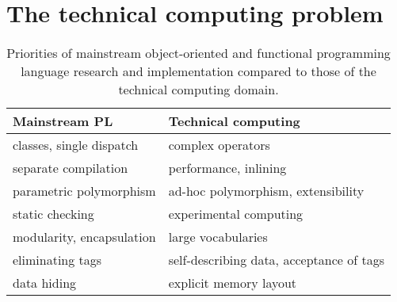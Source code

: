 

\section{The technical computing problem}

\begin{singlespace}
\begin{table}
  \begin{center}
    \def\arraystretch{1.25}
    \begin{tabular}{|l|l|}\hline
      \textbf{Mainstream PL} & \textbf{Technical computing} \\
      \hline \hline
      classes, single dispatch             &  complex operators \\
      \hline
      separate compilation                 &  performance, inlining \\
      \hline
      parametric polymorphism              &  ad-hoc polymorphism, extensibility \\
      \hline
      static checking                      &  experimental computing \\
      \hline
      modularity, encapsulation            &  large vocabularies \\
      \hline
      eliminating tags                     &  self-describing data, acceptance of tags \\
      \hline
      data hiding                          &  explicit memory layout \\
      \hline
    \end{tabular}
  \end{center}
  \caption[Programming language priorities]{
\small{
Priorities of mainstream object-oriented and functional programming language research and
implementation compared to those of the technical computing domain.
}
  }
  \label{PLpriorities}
\end{table}
\end{singlespace}

